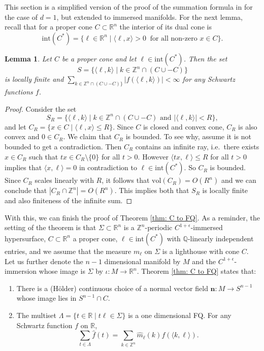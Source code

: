 \documentclass[11pt,letterpaper]{amsart}
\theoremstyle{definition}
\theoremstyle{plain}
\newtheorem{lem}[Def]{Lemma}
\newcommand{\nfield}{\mathbf n}
\newcommand{\R}{{\mathbb R}}
\newcommand{\Q}{{\mathbb Q}}
\newcommand{\Z}{{\mathbb Z}}
\begin{document}
This section is a simplified version of the proof of the summation formula in \cite{alon2025higher} for the case of $d=1$, but extended to immersed manifolds. For the next lemma, recall that for a proper cone $C\subset \R^n$ the interior of its dual cone is 
\[\mathrm{int}(C^*)=\{\ell\in\R^{n}\mid \langle \ell,x\rangle >0\ \text{  for all non-zero  $x\in C$}\}.\]
\begin{lem}\label{lem: bounded}
    Let $C$ be a proper cone and let $\ell\in\mathrm{int}(C^*)$. Then the set 
    $$S=\{\langle\ell,k\rangle\mid k\in\Z^n\cap(C\cup-C)\}$$ is locally finite and 
    $\sum_{k\in\Z^n\cap(C\cup-C)\}}|f(\langle\ell,k\rangle)|<\infty$ for any Schwartz functions $f$.
\end{lem}
\begin{proof}
Consider the set $$S_{R}=\{\langle\ell,k\rangle\mid k\in\Z^n\cap(C\cup-C)\textrm{ and }|\langle\ell,k\rangle|<R\},$$ and let $C_{R}=\{x\in C\mid \langle \ell,x\rangle\le R\}$. Since $C$ is closed and convex cone, $C_{R}$ is also convex and $0\in C_R$. We claim that $C_{R}$ is bounded. To see why, assume it is not bounded to get a contradiction. Then $C_R$ contains an infinite ray, i.e.~there exists $x\in C_{R}$ such that $tx\in C_{R}\setminus\{0\}$ for all $t>0$. However $\langle tx,\ell\rangle\le R$ for all $t>0$ implies that $\langle x,\ell\rangle=0$ in contradiction to $\ell\in\mathrm{int}(C^*)$. So $C_{R}$ is bounded. Since $C_{R}$ scales linearly with $R$, it follows that $\mathrm{vol}(C_{R})=O(R^n)$ and we can conclude that $|C_{R}\cap\Z^n|=O(R^n)$. This implies both that $S_R$ is locally finite and also finiteness of the infinite sum.
\end{proof}
With this, we can finish the proof of Theorem \ref{thm: C to FQ}. As a reminder, the setting of the theorem is that $\Sigma\subset\R^n$ is a $\Z^n$-periodic $C^{1+\epsilon}$-immersed hypersurface, $C\subset \R^n$ a proper cone, $\ell\in\mathrm{int}(C^{*})$ with $\Q$-linearly independent entries, and we assume that the measure $m_{\ell}$ on $\Sigma$ is a lighthouse with cone $C$. Let us further denote the $n-1$ dimensional manifold by $M$ and the $C^{1+\epsilon}$-immersion whose image is $\Sigma$ by $\iota\colon M\to\R^n$. Theorem \ref{thm: C to FQ} states that:
\begin{enumerate}
    \item There is a (Hölder) continuous choice of a normal vector field $\nfield:M\to S^{n-1} $ whose image lies in $S^{n-1}\cap C$.
    \item The multiset $\Lambda=\{t\in\R\mid t\ell\in\Sigma\}$ is a one dimensional FQ. For any Schwartz function $f$ on $\R$,
    \[\sum_{t\in\Lambda}\hat{f}(t)=\sum_{k\in\Z^n}\widehat{m}_{\ell}(k){f}(\langle k,\ell\rangle).\]  
\end{enumerate}
\end{document}
